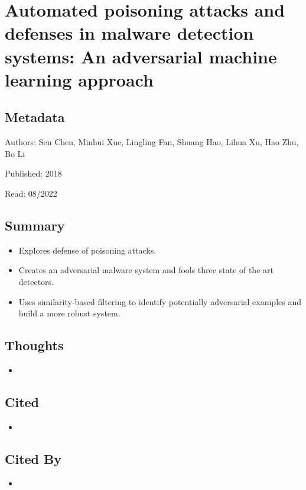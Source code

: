 \documentclass{article}
\begin{document}

\section*{Automated poisoning attacks and defenses in malware detection systems: An adversarial machine learning approach}

\subsection*{Metadata}

\noindent Authors: Sen Chen, Minhui Xue, Lingling Fan, Shuang Hao, Lihua Xu, Hao Zhu, Bo Li

\noindent Published: 2018

\noindent Read: 08/2022

\subsection*{Summary}
\begin{itemize}
\item Explores defense of poisoning attacks.
\item Creates an adversarial malware system and fools three state of the art detectors.
\item Uses similarity-based filtering to identify potentially adversarial examples and build a more robust system.
\end{itemize}

\subsection*{Thoughts}
\begin{itemize}
\item
\end{itemize}

\subsection*{Cited}
\begin{itemize}
\item
\end{itemize}

\subsection*{Cited By}
\begin{itemize}
\item
\end{itemize}
\end{document}
